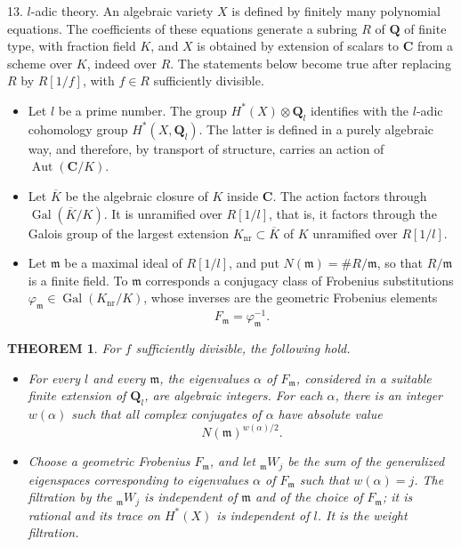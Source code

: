 \documentclass[10pt]{amsart}
\theoremstyle{plain}
\newtheorem{theorem}{THEOREM}
\theoremstyle{definition}
\theoremstyle{remark}
\DeclareMathOperator{\Aut}{Aut}
\DeclareMathOperator{\Gal}{Gal}
\begin{document}
13. $l$-adic theory. An algebraic variety $X$ is defined by finitely many polynomial equations. The coefficients of these equations generate a subring $R$ of $\mathbf Q$ of finite type, with fraction field $K$, and $X$ is obtained by extension of scalars to $\mathbf C$ from a scheme over $K$, indeed over $R$. The statements below become true after replacing $R$ by $R[1/f]$, with $f\in R$ sufficiently divisible.
\begin{itemize}
\item[(13.1)] Let $l$ be a prime number. The group $H^*(X)\otimes\mathbf Q_l$ identifies with the $l$-adic cohomology group $H^*(X,\mathbf Q_l)$. The latter is defined in a purely algebraic way, and therefore, by transport of structure, carries an action of $\Aut(\mathbf C/K)$.

\item[(13.2)] Let $\overline K$ be the algebraic closure of $K$ inside $\mathbf C$. The action factors through $\Gal(\overline K/K)$. It is unramified over $R[1/l]$, that is, it factors through the Galois group of the largest extension $K_{\mathrm{nr}}\subset\overline K$ of $K$ unramified over $R[1/l]$.

\item[(13.3)] Let $\mathfrak m$ be a maximal ideal of $R[1/l]$, and put $N(\mathfrak m)=\#R/\mathfrak m$, so that $R/\mathfrak m$ is a finite field. To $\mathfrak m$ corresponds a conjugacy class of Frobenius substitutions $\varphi_{\mathfrak m}\in\Gal(K_{\mathrm{nr}}/K)$, whose inverses are the geometric Frobenius elements
\[
F_{\mathfrak m}=\varphi_{\mathfrak m}^{-1}.
\]
\end{itemize}

\begin{theorem}
For $f$ sufficiently divisible, the following hold.
\begin{itemize}
\item[(i)] For every $l$ and every $\mathfrak m$, the eigenvalues $\alpha$ of $F_{\mathfrak m}$, considered in a suitable finite extension of $\mathbf Q_l$, are algebraic integers. For each $\alpha$, there is an integer $w(\alpha)$ such that all complex conjugates of $\alpha$ have absolute value
\[
N(\mathfrak m)^{w(\alpha)/2}.
\]

\item[(ii)] Choose a geometric Frobenius $F_{\mathfrak m}$, and let ${}_{\mathfrak m}W_j$ be the sum of the generalized eigenspaces corresponding to eigenvalues $\alpha$ of $F_{\mathfrak m}$ such that $w(\alpha)=j$. The filtration by the ${}_{\mathfrak m}W_j$ is independent of $\mathfrak m$ and of the choice of $F_{\mathfrak m}$; it is rational and its trace on $H^*(X)$ is independent of $l$. It is the weight filtration.
\end{itemize}
\end{theorem}
\end{document}
